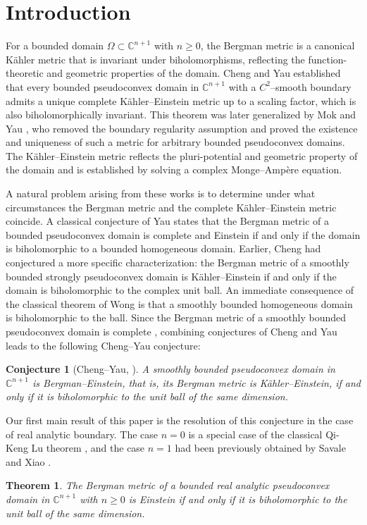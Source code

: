 \documentclass[a4paper,centertags,oneside,12pt]{amsart}
\newcommand{\CC}{\mathbb C}
\newtheorem{theorem}{Theorem}[section]
\newtheorem*{conjecture}{Conjecture}
\numberwithin{equation}{section}
\begin{document}
\tableofcontents
\section{Introduction}
For a bounded domain $\Omega \subset \mathbb{C}^{n+1}$ with $n\ge 0$, the Bergman metric is a canonical K\"ahler metric that is invariant under biholomorphisms, reflecting the function-theoretic and geometric properties of the domain. Cheng and Yau \cite{CY80} established that every bounded pseudoconvex domain in $\mathbb{C}^{n+1}$ with a $C^2$--smooth boundary admits a unique complete K\"ahler--Einstein metric up to a scaling factor, which is also biholomorphically invariant. This  theorem was later generalized by Mok and Yau \cite{MY80}, who removed the boundary regularity assumption and proved the existence and uniqueness of such a metric for arbitrary bounded pseudoconvex domains. The K\"ahler--Einstein metric reflects the pluri-potential and  geometric property of the domain and is  established by solving  a complex Monge--Amp\`ere equation.

 A natural  problem arising from these works is to determine under what circumstances the Bergman metric and the complete K\"ahler--Einstein metric coincide. A classical conjecture of Yau \cite{Yau82} states that the Bergman metric of a bounded pseudoconvex domain  is complete and Einstein  if and only if the domain is biholomorphic to a bounded homogeneous domain. Earlier, Cheng \cite{C79} had conjectured a more specific characterization: the Bergman metric of a smoothly bounded strongly pseudoconvex domain is K\"ahler--Einstein if and only if the domain is biholomorphic to the complex unit ball.  An immediate consequence of the classical theorem of Wong \cite{W77} is that a smoothly bounded homogeneous domain is biholomorphic to the ball. Since the Bergman metric of a smoothly bounded pseudoconvex domain is complete \cite{Oh81}, combining conjectures of Cheng and Yau leads to the  following Cheng--Yau conjecture:

\begin{conjecture}[Cheng--Yau, \cite{C79,Yau82,W77}]\label{Cheng--Yau-Conjecture}A smoothly bounded pseudoconvex domain in $\CC^{n+1}$ is  Bergman--Einstein, that is, its Bergman metric is K\"ahler--Einstein, if and only if it is biholomorphic to the unit ball of the same dimension.
\end{conjecture}
Our first  main result of this paper is the resolution of this conjecture in the case of real analytic boundary. The case $n=0$ is a special case of the classical Qi-Keng Lu theorem \cite{Lu66},  and the case $n=1$ had been previously obtained by Savale and Xiao \cite{SX25}. 
\begin{theorem}\label{Main theorem 3}
    The Bergman metric of a  bounded real analytic  pseudoconvex domain in  $\CC^{n+1}$ with $n\ge 0$ is Einstein if and only if it is biholomorphic to the unit ball of the same dimension.
\end{theorem}
\end{document}
